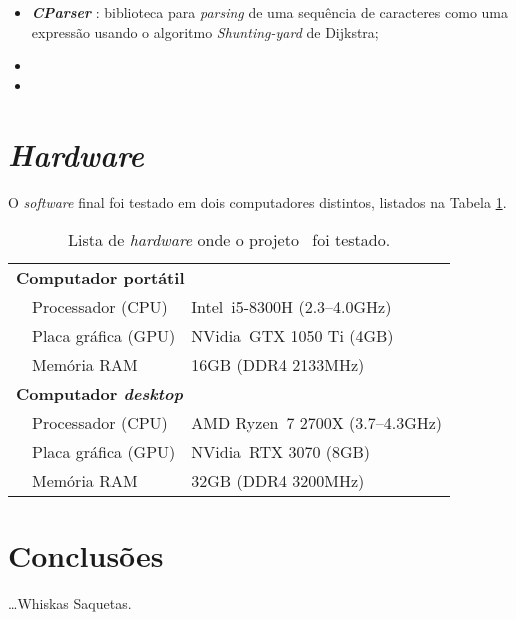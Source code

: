 \begin{itemize}
    \item \textbf{\textit{CParser}} : biblioteca para \textit{parsing} de uma sequência de caracteres como uma expressão usando o algoritmo \textit{Shunting-yard} de Dijkstra;
    
    \item {}
    
    \item {}
\end{itemize}


\section{\textit{Hardware}}
\label{sec::tecno:hw}

O \textit{software} final foi testado em dois computadores distintos, listados na Tabela \ref{tab::hardware}.

\begin{table}[!p]
	\centering
	\caption[Lista de \textit{hardware} para testes]{Lista de \textit{hardware} onde o projeto \theapp~foi testado.}
	\label{tab::hardware}
	\begin{tabular}{p{1cm} l l}
		\toprule
		\multicolumn{3}{l}{\bfseries Computador portátil} \\
		& Processador (\acs{CPU})   & Intel\registered~i5-8300H (2.3--4.0GHz) \\
		& Placa gráfica (\acs{GPU}) & NVidia\registered~GTX 1050 Ti (4GB) \\
		& Memória \acs{RAM}         & 16GB (DDR4 2133MHz) \\
		\midrule
		\multicolumn{3}{l}{\bfseries Computador \textit{desktop}} \\
		& Processador (\acs{CPU})   & AMD Ryzen\texttrademark~7 2700X (3.7--4.3GHz) \\
		& Placa gráfica (\acs{GPU}) & NVidia\registered~RTX 3070 (8GB) \\
		& Memória \acs{RAM}         & 32GB (DDR4 3200MHz) \\
		\bottomrule
	\end{tabular}
\end{table}


\section{Conclusões}
\label{sec::tecno:conc}

\ldots Whiskas Saquetas.
